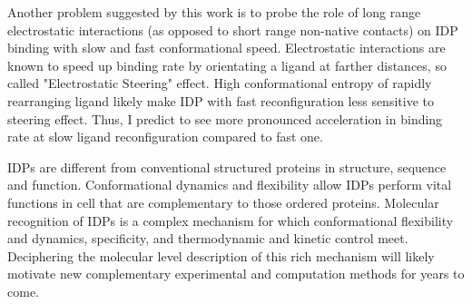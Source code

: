 \documentclass[../talant.diss.submit.tex]{subfiles}
\begin{document}
Another problem suggested by this work is to probe
the role of long range electrostatic
interactions (as opposed to short range non-native contacts) on IDP binding with slow and fast
conformational speed. Electrostatic interactions are known to speed up binding rate by
orientating a ligand at farther distances, so called "Electrostatic Steering" effect. High
conformational entropy of rapidly rearranging ligand likely make IDP with fast reconfiguration
less sensitive to steering effect. Thus, I predict to see more pronounced acceleration in binding
rate at slow ligand reconfiguration compared to fast one.

IDPs are different from conventional structured proteins in structure, sequence and function.
Conformational dynamics and flexibility allow IDPs perform vital functions in cell that are
complementary to those ordered proteins.
Molecular recognition of IDPs is a  complex mechanism for which conformational flexibility and
dynamics, specificity, and thermodynamic and kinetic control meet. Deciphering the molecular
level description of this rich mechanism will likely motivate new complementary experimental
and computation methods for years to come. 
\end{document}
